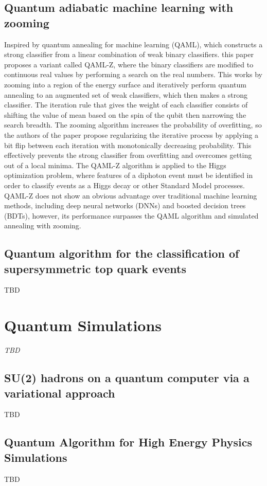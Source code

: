 \subsection{Quantum adiabatic machine learning with zooming~\cite{Zlokapa:2019lvv}}
Inspired by quantum annealing for machine learning (QAML), which constructs a strong classifier from a linear combination of weak binary classifiers. this paper proposes a variant called QAML-Z, where the binary classifiers are modified to continuous real values by performing a search on the real numbers. This works by zooming into a region of the energy surface and iteratively perform quantum annealing to an augmented set of weak classifiers, which then makes a strong classifier. The iteration rule that gives the weight of each classifier consists of shifting the value of mean based on the spin of the qubit then narrowing the search breadth. The zooming algorithm increases the probability of overfitting, so the authors of the paper propose regularizing the iterative process by applying a bit flip between each iteration with monotonically decreasing probability. This effectively prevents the strong classifier from overfitting and overcomes getting out of a local minima. The QAML-Z algorithm is applied to the Higgs optimization problem, where features of a diphoton event must be identified in order to classify events as a Higgs decay or other Standard Model processes. QAML-Z does not show an obvious advantage over traditional machine learning methods, including deep neural networks (DNNs) and boosted decision trees (BDTs), however, its performance surpasses the QAML algorithm and simulated annealing with zooming.
\subsection{Quantum algorithm for the classification of supersymmetric top quark events~\cite{Bargassa:2021jmk}}
TBD


\section{Quantum Simulations}

\textit{TBD}

\subsection{SU(2) hadrons on a quantum computer via a variational approach~\cite{Atas:2021ext}}
TBD
\subsection{Quantum Algorithm for High Energy Physics Simulations~\cite{Bauer:2019qxa}}
TBD
